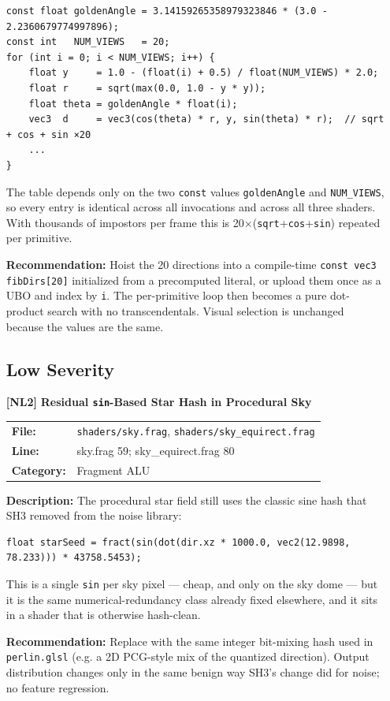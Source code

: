 \documentclass[a4paper,12pt]{article}
\newcommand{\severitybox}[2]{%
  \colorbox{#1}{\makebox[2.5cm][c]{\textcolor{white}{\textbf{#2}}}}%
}
\begin{document}
\begin{enumerate}[leftmargin=*]
\begin{lstlisting}
const float goldenAngle = 3.14159265358979323846 * (3.0 - 2.2360679774997896);
const int   NUM_VIEWS   = 20;
for (int i = 0; i < NUM_VIEWS; i++) {
    float y     = 1.0 - (float(i) + 0.5) / float(NUM_VIEWS) * 2.0;
    float r     = sqrt(max(0.0, 1.0 - y * y));
    float theta = goldenAngle * float(i);
    vec3  d     = vec3(cos(theta) * r, y, sin(theta) * r);  // sqrt + cos + sin ×20
    ...
}
\end{lstlisting}

  The table depends only on the two \texttt{const} values \texttt{goldenAngle}
  and \texttt{NUM\_VIEWS}, so every entry is identical across all invocations
  and across all three shaders. With thousands of impostors per frame this is
  20×(\texttt{sqrt}+\texttt{cos}+\texttt{sin}) repeated per primitive.

  \textbf{Recommendation:}
  Hoist the 20 directions into a compile-time \texttt{const vec3 fibDirs[20]}
  initialized from a precomputed literal, or upload them once as a UBO and index
  by \texttt{i}. The per-primitive loop then becomes a pure dot-product search
  with no transcendentals. Visual selection is unchanged because the values are
  the same.

\subsection{Low Severity}

\item[\textbf{[NL2]}] \textbf{Residual \texttt{sin}-Based Star Hash in Procedural Sky}
  \hfill \severitybox{lowcolor}{LOW}

  \begin{tabular}{ll}
    \textbf{File:} & \texttt{shaders/sky.frag}, \texttt{shaders/sky\_equirect.frag} \\
    \textbf{Line:} & sky.frag 59; sky\_equirect.frag 80 \\
    \textbf{Category:} & Fragment ALU \\
  \end{tabular}

  \textbf{Description:}
  The procedural star field still uses the classic sine hash that SH3 removed
  from the noise library:

\begin{lstlisting}
float starSeed = fract(sin(dot(dir.xz * 1000.0, vec2(12.9898, 78.233))) * 43758.5453);
\end{lstlisting}

  This is a single \texttt{sin} per sky pixel — cheap, and only on the sky dome
  — but it is the same numerical-redundancy class already fixed elsewhere, and
  it sits in a shader that is otherwise hash-clean.

  \textbf{Recommendation:}
  Replace with the same integer bit-mixing hash used in \texttt{perlin.glsl}
  (e.g. a 2D PCG-style mix of the quantized direction). Output distribution
  changes only in the same benign way SH3's change did for noise; no feature
  regression.

\end{enumerate}
\end{document}
